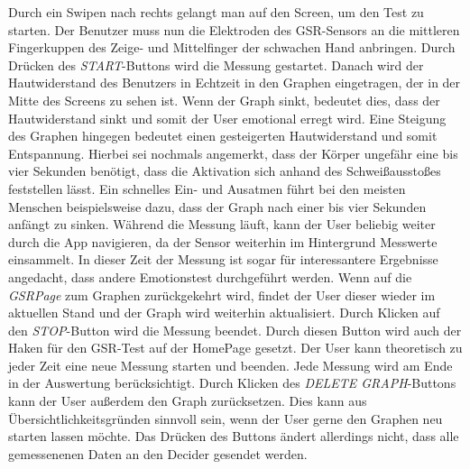 Durch ein Swipen nach rechts gelangt man auf den Screen, um den Test zu starten. Der Benutzer muss nun die Elektroden des GSR-Sensors an die mittleren Fingerkuppen des Zeige- und Mittelfinger der schwachen Hand anbringen. Durch Drücken des \textit{START}-Buttons wird die Messung gestartet. Danach wird der Hautwiderstand des Benutzers in Echtzeit in den Graphen eingetragen, der in der Mitte des Screens zu sehen ist. Wenn der Graph sinkt, bedeutet dies, dass der Hautwiderstand sinkt und somit der User emotional erregt wird. Eine Steigung des Graphen hingegen bedeutet einen gesteigerten Hautwiderstand und somit Entspannung. Hierbei sei nochmals angemerkt, dass der Körper ungefähr eine bis vier Sekunden benötigt, dass die Aktivation sich anhand des Schweißausstoßes feststellen lässt. Ein schnelles Ein- und Ausatmen führt bei den meisten Menschen beispielsweise dazu, dass der Graph nach einer bis vier Sekunden anfängt zu sinken. \newline
Während die Messung läuft, kann der User beliebig weiter durch die App navigieren, da der Sensor weiterhin im Hintergrund Messwerte einsammelt. In dieser Zeit der Messung ist sogar für interessantere Ergebnisse angedacht, dass andere Emotionstest durchgeführt werden. Wenn auf die \textit{GSRPage} zum Graphen zurückgekehrt wird, findet der User dieser wieder im aktuellen Stand und der Graph wird weiterhin aktualisiert. Durch Klicken auf den \textit{STOP}-Button wird die Messung beendet. Durch diesen Button wird auch der Haken für den GSR-Test auf der HomePage gesetzt. Der User kann theoretisch zu jeder Zeit eine neue Messung starten und beenden. Jede Messung wird am Ende in der Auswertung berücksichtigt. \newline
Durch Klicken des \textit{DELETE GRAPH}-Buttons kann der User außerdem den Graph zurücksetzen. Dies kann aus Übersichtlichkeitsgründen sinnvoll sein, wenn der User gerne den Graphen neu starten lassen möchte. Das Drücken des Buttons ändert allerdings nicht, dass alle gemessenenen Daten an den Decider gesendet werden.
